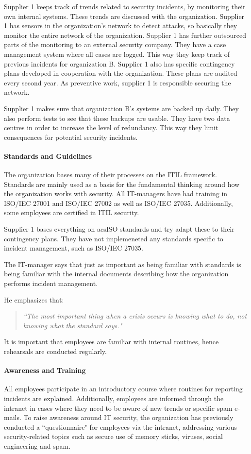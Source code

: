 Supplier 1 keeps track of trends related to security incidents, by monitoring their own internal systems. These trends are discussed with the organization. Supplier 1 has sensors in the organization's network to detect attacks, so basically they monitor the entire network of the organization. Supplier 1 has further outsourced parts of the monitoring to an external security company. They have a case management system where all cases are logged. This way they keep track of previous incidents for organization B. Supplier 1 also has specific contingency plans developed in cooperation with the organization. These plans are audited every second year. As preventive work, supplier 1 is responsible securing the network.

Supplier 1 makes sure that organization B's systems are backed up daily. They also perform tests to see that these backups are usable. They have two data centres in order to increase the level of redundancy. This way they limit consequences for potential security incidents.

\paragraph{Standards and Guidelines}
The organization bases many of their processes on the ITIL framework. Standards are mainly used as a basis for the fundamental thinking around how the organization works with security. All IT-managers have had training in ISO/IEC 27001 and ISO/IEC 27002 as well as ISO/IEC 27035. Additionally, some employees are certified in ITIL security. 

Supplier 1 bases everything on acs{ISO} standards and try adapt these to their contingency plans. They have not implemeneted any standards specific to incident management, such as \acs{ISO}/\acs{IEC} 27035. 

The IT-manager says that just as important as being familiar with standards is being familiar with the internal documents describing how the organization performs incident management. 

He emphasizes that:
\begin{quote}
\textit{``The most important thing when a crisis occurs is knowing what to do, not knowing what the standard says."}
\end{quote}
It is important that employees are familiar with internal routines, hence rehearsals are conducted regularly.

\paragraph{Awareness and Training}
All employees participate in an introductory course where routines for reporting incidents are explained. Additionally, employees are informed through the intranet in cases where they need to be aware of new trends or specific spam e-mails. To raise awareness around IT security, the organization has previously conducted a ``questionnaire" for employees via the intranet, addressing various security-related topics such as secure use of memory sticks, viruses, social engineering and spam. 

